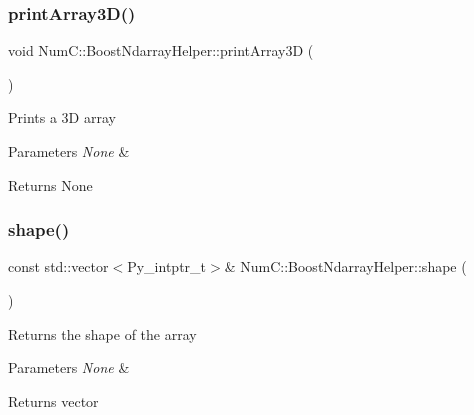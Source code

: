 \subsubsection{\texorpdfstring{print\+Array3\+D()}{printArray3D()}}
{\footnotesize\ttfamily void Num\+C\+::\+Boost\+Ndarray\+Helper\+::print\+Array3D (\begin{DoxyParamCaption}{ }\end{DoxyParamCaption})\hspace{0.3cm}{\ttfamily [inline]}}

Prints a 3D array


\begin{DoxyParams}{Parameters}
{\em None} & \\
\hline
\end{DoxyParams}
\begin{DoxyReturn}{Returns}
None 
\end{DoxyReturn}
\mbox{\label{class_num_c_1_1_boost_ndarray_helper_a816ee8ee38680bbeb977725474d58559}} 
\subsubsection{\texorpdfstring{shape()}{shape()}}
{\footnotesize\ttfamily const std\+::vector$<$Py\+\_\+intptr\+\_\+t$>$\& Num\+C\+::\+Boost\+Ndarray\+Helper\+::shape (\begin{DoxyParamCaption}{ }\end{DoxyParamCaption})\hspace{0.3cm}{\ttfamily [inline]}}

Returns the shape of the array


\begin{DoxyParams}{Parameters}
{\em None} & \\
\hline
\end{DoxyParams}
\begin{DoxyReturn}{Returns}
vector 
\end{DoxyReturn}
\mbox{\label{class_num_c_1_1_boost_ndarray_helper_aa0fd675809776b5a6b582282c7ef40b2}} 
